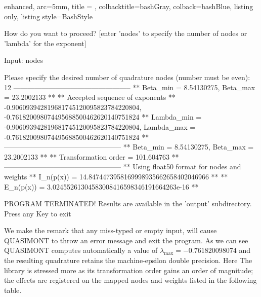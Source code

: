 \documentclass[a4paper, twosided]{book}
\begin{document}
\begin{tcblisting}{enhanced,
                   arc=5mm,
                   title = \color{black}{\large \ttfamily Building and executing the test driver: p\_2(x)},
                   colbacktitle=bashGray,
                   colback=bashBlue,
                   listing only,
                   listing style=BashStyle}
                   
How do you want to proceed?
   [enter 'nodes' to specify the number of nodes or 'lambda' for the exponent]

                 Input: nodes


Please specify the desired number of quadrature nodes (number must be even): 12
 --------------------------------------------------
 ** Beta_min = 8.54130275, Beta_max = 23.2002133 **
 ** Accepted sequence of exponents ** 
    {-0.906093942819681745120095823784220804, -0.761820098074495688500462620140751824}
 ** Lambda_min = -0.906093942819681745120095823784220804, Lambda_max = -0.761820098074495688500462620140751824 **
 --------------------------------------------------
 ** Beta_min = 8.54130275, Beta_max = 23.2002133 **
 ** Transformation order = 101.604763 **
 --------------------------------------------------
 ** Using float50 format for nodes and weights
 ** I_n(p(x)) = 14.8474473958169998935662658402046966 **
 ** E_n(p(x)) = 3.02455261304583008416598346191664263e-16 **


PROGRAM TERMINATED! Results are available in the 'output' subdirectory.
Press any Key to exit
\end{tcblisting}

We make the remark that any miss-typed or empty input, will cause QUASIMONT to throw an error message and exit the program. As we can see QUASIMONT computes automatically a value of $\lambda_{\text{max}} = -0.761820098074$ and the resulting quadrature retains the machine-epsilon double precision. Here The library is stressed more as its transformation order gains an order of magnitude; the effects are registered on the mapped nodes and weights listed in the following table.
\end{document}

